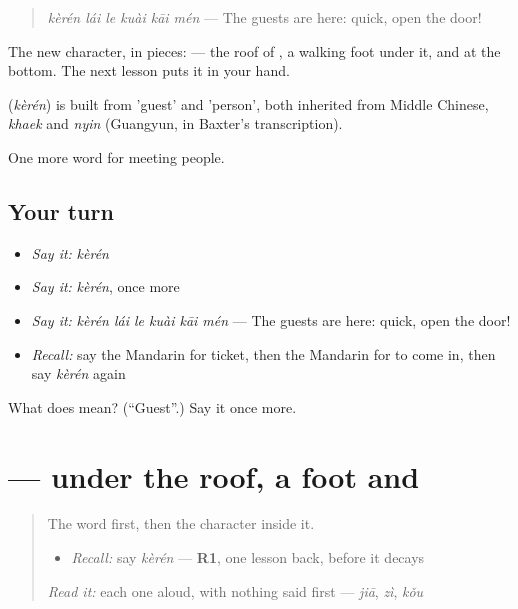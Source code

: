 \begin{quote}
\textbf{} \emph{kèrén lái le kuài kāi mén} — The guests are here: quick, open the door!
\end{quote}

The new character, in pieces:  — the roof of , a walking foot under it, and  at the bottom. The next lesson puts it in your hand.

\begin{cousinweb}
\textbf{} (\emph{kèrén}) is built from  'guest' and  'person', both inherited from Middle Chinese, \emph{khaek} and \emph{nyin} (Guangyun, in Baxter's transcription).
\end{cousinweb}

\begin{grammarlens}[title={What you've built}]
One more word for meeting people.
\end{grammarlens}

\subsection*{Your turn}
\begin{itemize}
\raggedright
  \item \emph{Say it:} \emph{kèrén}
  \item \emph{Say it:} \emph{kèrén}, once more
  \item \emph{Say it:} \emph{kèrén lái le kuài kāi mén} — The guests are here: quick, open the door!
  \item \emph{Recall:} say the Mandarin for ticket, then the Mandarin for to come in, then say \emph{kèrén} again
\end{itemize}

\begin{tcolorbox}[breakable,colback=teal!4,colframe=teal!35!black,title={Before you move on}]
What does  mean? (\textquotedblleft{}Guest\textquotedblright{}.) Say it once more.
\end{tcolorbox}
\section[\texorpdfstring{\zh{客} (kè)}{客 (kè)}]{ — under the roof, a foot and }

\label{lesson:ZH-W74-ke-guest}



\begin{quote}
The word first, then the character inside it.

\begin{itemize}
\raggedright
  \item \emph{Recall:} say \emph{kèrén} — \textbf{R1}, one lesson back, before it decays
\end{itemize}

\begin{quote}
  
\end{quote}

\emph{Read it:} each one aloud, with nothing said first — \emph{jiā}, \emph{zì}, \emph{kǒu}
\end{quote}

